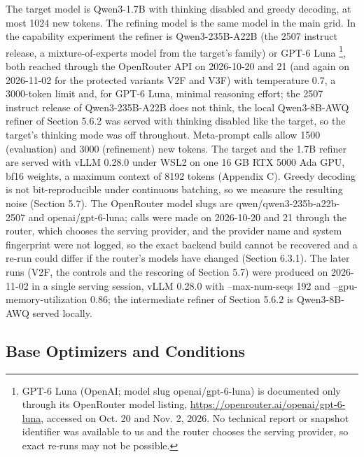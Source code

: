 \documentclass{ieeeaccess}
\begin{document}
The target model is Qwen3-1.7B \cite{qwenteam2025} with thinking disabled and greedy decoding, at most 1024 new tokens. The refining model is the same model in the main grid. In the capability experiment the refiner is Qwen3-235B-A22B (the 2507 instruct release, a mixture-of-experts model from the target's family) or GPT-6 Luna \cite{luna2026}\footnote{GPT-6 Luna (OpenAI; model slug openai/gpt-6-luna) is documented only through its OpenRouter model listing, \url{https://openrouter.ai/openai/gpt-6-luna}, accessed on Oct. 20 and Nov. 2, 2026. No technical report or snapshot identifier was available to us and the router chooses the serving provider, so exact re-runs may not be possible.}, both reached through the OpenRouter API on 2026-10-20 and 21 (and again on 2026-11-02 for the protected variants V2F and V3F) with temperature 0.7, a 3000-token limit and, for GPT-6 Luna, minimal reasoning effort; the 2507 instruct release of Qwen3-235B-A22B does not think, the local Qwen3-8B-AWQ refiner of Section 5.6.2 was served with thinking disabled like the target, so the target's thinking mode was off throughout. Meta-prompt calls allow 1500 (evaluation) and 3000 (refinement) new tokens. The target and the 1.7B refiner are served with vLLM \cite{kwon2023} 0.28.0 under WSL2 on one 16 GB RTX 5000 Ada GPU, bf16 weights, a maximum context of 8192 tokens (Appendix C). Greedy decoding is not bit-reproducible under continuous batching, so we measure the resulting noise (Section 5.7). The OpenRouter model slugs are qwen/qwen3-235b-a22b-2507 and openai/gpt-6-luna; calls were made on 2026-10-20 and 21 through the router, which chooses the serving provider, and the provider name and system fingerprint were not logged, so the exact backend build cannot be recovered and a re-run could differ if the router's models have changed (Section 6.3.1). The later runs (V2F, the controls and the rescoring of Section 5.7) were produced on 2026-11-02 in a single serving session, vLLM 0.28.0 with --max-num-seqs 192 and --gpu-memory-utilization 0.86; the intermediate refiner of Section 5.6.2 is Qwen3-8B-AWQ served locally.

\subsection{Base Optimizers and Conditions}
\end{document}
